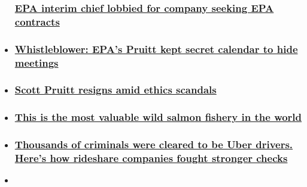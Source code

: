 \begin{itemize}
{  \subsubsection{\texorpdfstring{\href{/2018/07/06/politics/epa-andrew-wheeler-contracts/index.html}{EPA
  interim chief lobbied for company seeking EPA
  contracts}}{EPA interim chief lobbied for company seeking EPA contracts}}\label{epa-interim-chief-lobbied-for-company-seeking-epa-contracts}}
\item
  \hypertarget{whistleblower-epas-pruitt-kept-secret-calendar-to-hide-meetings}{%
  \subsubsection{\texorpdfstring{\href{/2018/07/02/politics/scott-pruitt-whistleblower-secret-calendar/index.html}{Whistleblower:
  EPA's Pruitt kept secret calendar to hide
  meetings}}{Whistleblower: EPA's Pruitt kept secret calendar to hide meetings}}\label{whistleblower-epas-pruitt-kept-secret-calendar-to-hide-meetings}}
\item
  \hypertarget{scott-pruitt-resigns-amid-ethics-scandals}{%
  \subsubsection{\texorpdfstring{\href{/videos/politics/2018/07/06/scott-pruitt-resigns-griffin-dnt-ac360-vpx.cnn}{Scott
  Pruitt resigns amid ethics
  scandals}}{Scott Pruitt resigns amid ethics scandals}}\label{scott-pruitt-resigns-amid-ethics-scandals}}
\item
  \hypertarget{this-is-the-most-valuable-wild-salmon-fishery-in-the-world}{%
  \subsubsection{\texorpdfstring{\href{/2017/10/10/politics/bristol-bay-salmon-invs/index.html}{This
  is the most valuable wild salmon fishery in the
  world}}{This is the most valuable wild salmon fishery in the world}}\label{this-is-the-most-valuable-wild-salmon-fishery-in-the-world}}
\item
  \hypertarget{thousands-of-criminals-were-cleared-to-be-uber-drivers-heres-how-rideshare-companies-fought-stronger-checks}{%
  \subsubsection{\texorpdfstring{\href{/2018/06/01/us/felons-driving-for-uber-invs/index.html}{Thousands
  of criminals were cleared to be Uber drivers. Here's how rideshare
  companies fought stronger
  checks}}{Thousands of criminals were cleared to be Uber drivers. Here's how rideshare companies fought stronger checks}}\label{thousands-of-criminals-were-cleared-to-be-uber-drivers-heres-how-rideshare-companies-fought-stronger-checks}}
\item
  \hypertarget{the-felons-found-driving-for-uber}{%
}
\end{itemize}
